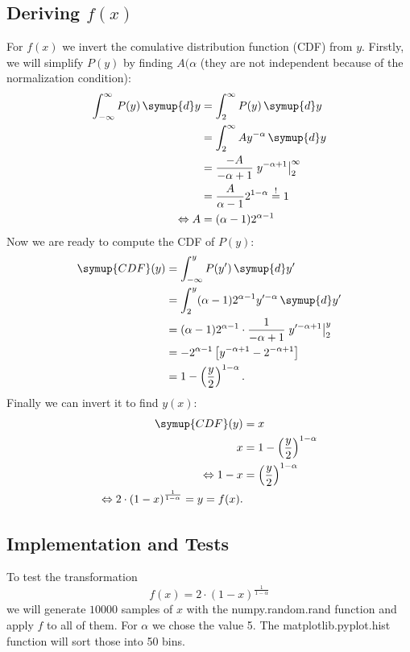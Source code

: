 \documentclass{article}
\begin{document}
\subsection{Deriving $f(x)$}
For $f(x)$ we invert the comulative distribution function (CDF) from $y$. Firstly, we will simplify $P(y)$ 
by finding $A(\alpha$ (they are not independent because of the normalization condition):
\begin{align*}
  \int_{-\infty}^{\infty} P(y) \, \symup{d}y 
  &= \int_{2}^{\infty} P(y) \, \symup{d}y \\
  &= \int_{2}^{\infty} A y^{-\alpha} \, \symup{d}y \\
  &= \frac{-A}{-\alpha+1} \left. y^{-\alpha+1} \right\vert_2^\infty \\
  &= \frac{A}{\alpha - 1} 2^{1-\alpha} \overset{!}{=} 1 \\
  \Leftrightarrow
  A &= (\alpha - 1) 2^{\alpha - 1}
\end{align*}
Now we are ready to compute the CDF of $P(y)$:
\begin{align*}
  \symup{CDF}(y) &= \int_{-\infty}^{y} P(y^\prime) \, \symup{d}y^\prime  \\
                 &= \int_{2}^{y} (\alpha - 1) 2^{\alpha -1} y^{\prime-\alpha} \, \symup{d}y^\prime \\
                 &= (\alpha-1) 2^{\alpha-1} \cdot \frac{1}{-\alpha+1} \left. y^{\prime -\alpha +1} \right\vert_2^y \\
                 &= -2^{\alpha-1} \left[ y^{-\alpha+1} - 2^{-\alpha +1} \right] \\
                 &= 1 - \left( \frac{y}{2} \right)^{1-\alpha}.
\end{align*}
Finally we can invert it to find $y(x)$:
\begin{align*}
  \symup{CDF}(y) &= x \\
  x &= 1 - \left( \frac{y}{2} \right)^{1-\alpha} \\
  \Leftrightarrow 
  1 - x &= \left( \frac{y}{2} \right)^{1-\alpha} \\
  \Leftrightarrow
  2 \cdot \left(1 - x\right)^{\frac{1}{1-\alpha}} = y = f(x).
\end{align*}

\subsection{Implementation and Tests}
\label{sec:implementation}
To test the transformation 
\[
  f(x) = 2 \cdot \left(1 - x\right)^{\frac{1}{1-\alpha}}
\]
we will generate $10000$ samples of $x$ with the numpy.random.rand function and apply $f$ to all of them. For
$\alpha$ we chose the value 5.
The matplotlib.pyplot.hist function will sort those into 50 bins. 
\end{document}
